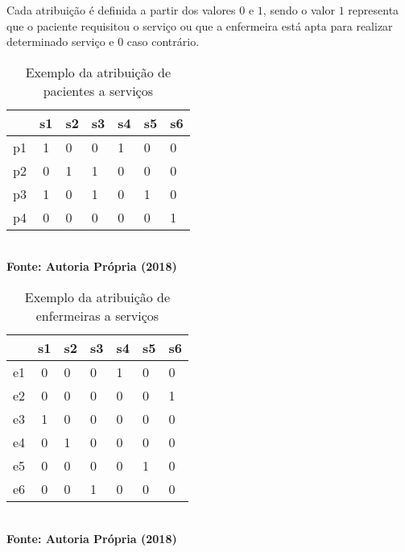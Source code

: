 Cada atribuição é definida a partir dos valores $0$ e $1$, sendo o valor $1$ representa que o paciente requisitou o serviço ou que a enfermeira está apta para realizar determinado serviço e $0$ caso contrário. \\

\begin{table}[!ht]
\centering
\caption{Exemplo da atribuição de pacientes a serviços \label{paciente_serviço}}
\begin{tabular}{c|c|l|l|l|l|l}
   & s1 & s2 & s3 & s4 & s5 & s6 \\ \hline
p1 & 1  & 0  & 0  & 1  & 0  & 0  \\ \hline
p2 & 0  & 1  & 1  & 0  & 0  & 0  \\ \hline
p3 & 1  & 0  & 1  & 0  & 1  & 0  \\ \hline
p4 & 0  & 0  & 0  & 0  & 0  & 1  \\ \hline
\end{tabular}
{\footnotesize\\ \textbf{Fonte: Autoria Própria (2018)}}
\end{table}


\begin{table}[!ht]
\centering
\caption{Exemplo da atribuição de enfermeiras a serviços \label{enfermeira_serviço}}
\begin{tabular}{c|c|l|l|l|l|l}
   & s1 & s2 & s3 & s4 & s5 & s6\\ \hline
e1 & 0  & 0  & 0  & 1  & 0  & 0  \\ \hline
e2 & 0  & 0  & 0  & 0  & 0  & 1  \\ \hline
e3 & 1  & 0  & 0  & 0  & 0  & 0  \\ \hline
e4 & 0  & 1  & 0  & 0  & 0  & 0  \\ \hline
e5 & 0  & 0  & 0  & 0  & 1  & 0  \\ \hline
e6 & 0  & 0  & 1  & 0  & 0  & 0  \\ \hline
\end{tabular}
{\footnotesize\\ \textbf{Fonte: Autoria Própria (2018)}}
\end{table}





